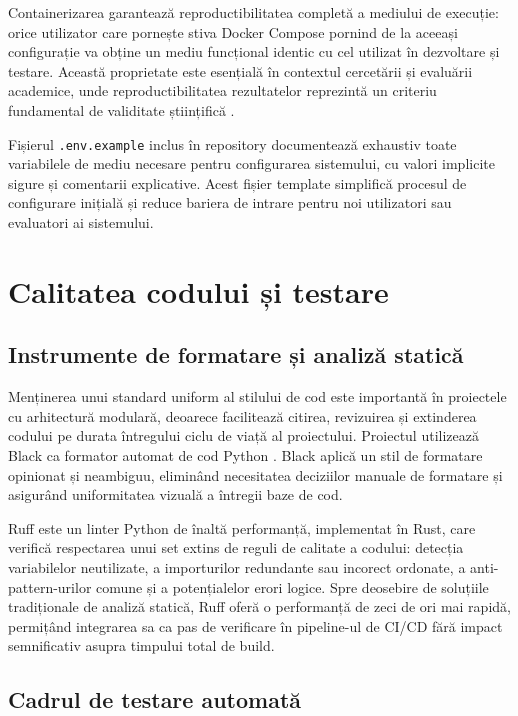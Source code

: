 \documentclass[12pt, a4paper, oneside, romanian]{teza-upb}
\begin{document}
Containerizarea garantează reproductibilitatea completă a mediului de execuție: orice utilizator care pornește stiva Docker Compose pornind de la aceeași configurație va obține un mediu funcțional identic cu cel utilizat în dezvoltare și testare. Această proprietate este esențială în contextul cercetării și evaluării academice, unde reproductibilitatea rezultatelor reprezintă un criteriu fundamental de validitate științifică \cite{goodfellow2016}.

Fișierul \texttt{.env.example} inclus în repository documentează exhaustiv toate variabilele de mediu necesare pentru configurarea sistemului, cu valori implicite sigure și comentarii explicative. Acest fișier template simplifică procesul de configurare inițială și reduce bariera de intrare pentru noi utilizatori sau evaluatori ai sistemului.

\section{Calitatea codului și testare}

\subsection{Instrumente de formatare și analiză statică}

Menținerea unui standard uniform al stilului de cod este importantă în proiectele cu arhitectură modulară, deoarece facilitează citirea, revizuirea și extinderea codului pe durata întregului ciclu de viață al proiectului. Proiectul utilizează Black ca formator automat de cod Python \cite{black_doc}. Black aplică un stil de formatare opinionat și neambiguu, eliminând necesitatea deciziilor manuale de formatare și asigurând uniformitatea vizuală a întregii baze de cod.

Ruff este un linter Python de înaltă performanță, implementat în Rust, care verifică respectarea unui set extins de reguli de calitate a codului: detecția variabilelor neutilizate, a importurilor redundante sau incorect ordonate, a anti-pattern-urilor comune și a potențialelor erori logice. Spre deosebire de soluțiile tradiționale de analiză statică, Ruff oferă o performanță de zeci de ori mai rapidă, permițând integrarea sa ca pas de verificare în pipeline-ul de CI/CD fără impact semnificativ asupra timpului total de build.

\subsection{Cadrul de testare automată}
\end{document}
